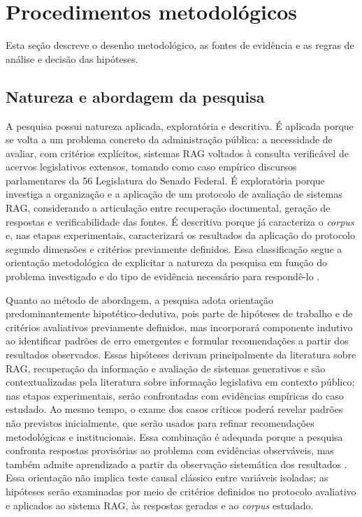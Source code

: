 \section{Procedimentos metodológicos}\label{sec:metodologia}

Esta seção descreve o desenho metodológico, as fontes de evidência e as regras de análise e decisão das hipóteses.

\subsection{Natureza e abordagem da pesquisa}

A pesquisa possui natureza aplicada, exploratória e descritiva. É aplicada porque se volta a um problema concreto da administração pública: a necessidade de avaliar, com critérios explícitos, sistemas RAG voltados à consulta verificável de acervos legislativos extensos, tomando como caso empírico discursos parlamentares da 56\textordfeminine{} Legislatura do Senado Federal. É exploratória porque investiga a organização e a aplicação de um protocolo de avaliação de sistemas RAG, considerando a articulação entre recuperação documental, geração de respostas e verificabilidade das fontes. É descritiva porque já caracteriza o \textit{corpus} e, nas etapas experimentais, caracterizará os resultados da aplicação do protocolo segundo dimensões e critérios previamente definidos. Essa classificação segue a orientação metodológica de explicitar a natureza da pesquisa em função do problema investigado e do tipo de evidência necessário para respondê-lo \parencite{gil2022projetosPesquisa}.

Quanto ao método de abordagem, a pesquisa adota orientação predominantemente hipotético-dedutiva, pois parte de hipóteses de trabalho e de critérios avaliativos previamente definidos, mas incorporará componente indutivo ao identificar padrões de erro emergentes e formular recomendações a partir dos resultados observados. Essas hipóteses derivam principalmente da literatura sobre RAG, recuperação da informação e avaliação de sistemas generativos e são contextualizadas pela literatura sobre informação legislativa em contexto público; nas etapas experimentais, serão confrontadas com evidências empíricas do caso estudado. Ao mesmo tempo, o exame dos casos críticos poderá revelar padrões não previstos inicialmente, que serão usados para refinar recomendações metodológicas e institucionais. Essa combinação é adequada porque a pesquisa confronta respostas provisórias ao problema com evidências observáveis, mas também admite aprendizado a partir da observação sistemática dos resultados \parencite{lakatosMarconi2021metodologia}. Essa orientação não implica teste causal clássico entre variáveis isoladas; as hipóteses serão examinadas por meio de critérios definidos no protocolo avaliativo e aplicados ao sistema RAG, às respostas geradas e ao \textit{corpus} estudado.

